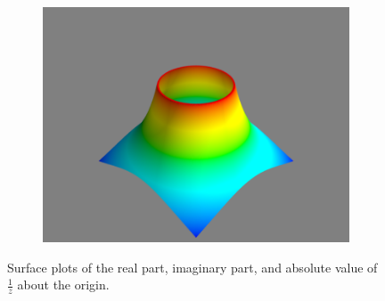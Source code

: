 \begin{figure}
\begin{subfigure}{.32\textwidth}
\includegraphics[width=\textwidth]{inv_abs_surface.png}
\end{subfigure}
\caption{Surface plots of the real part, imaginary part, and absolute value of $\frac{1}{z}$ about the origin.}
\label{fig:inv_surfaces}
\end{figure}

